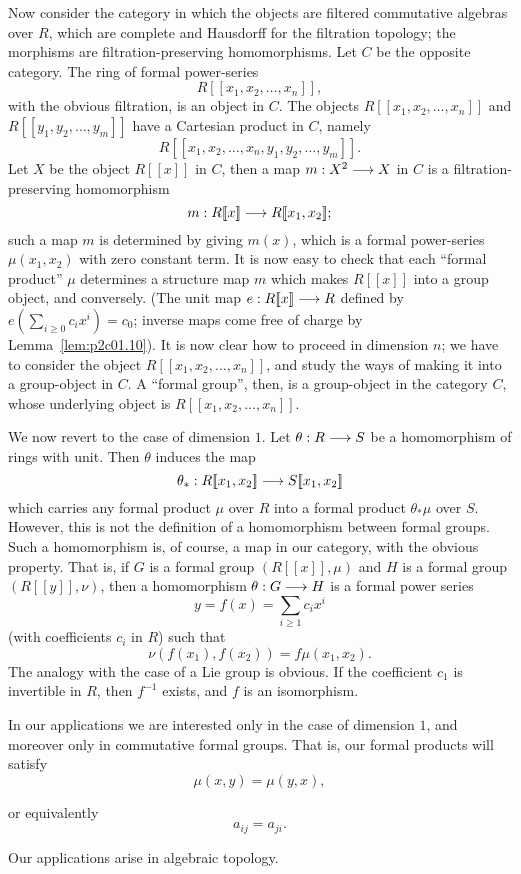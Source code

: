 \documentclass[../main]{subfiles}
\begin{document}
Now consider the category in which the objects are filtered commutative algebras over $R$, which are complete and Hausdorff for the filtration topology; the morphisms are filtration-preserving homomorphisms. Let $C$ be the opposite category. The ring of formal power-series $$R[\![x_1, x_2, \ldots, x_n]\!],$$ with the obvious filtration, is an object in $C$. The objects $R[\![x_1, x_2, \ldots, x_n]\!]$ and $R[\![y_1, y_2, \ldots, y_m]\!]$ have a Cartesian product in $C$, namely $$R[\![x_1, x_2, \ldots, x_n, y_1, y_2, \ldots, y_m]\!].$$ Let $X$ be the object $R[\![x]\!]$ in $C$, then a map $m : X^2 \overset{}{\longrightarrow} X$ in $C$ is a filtration-preserving homomorphism $$m : R[\![x]\!] \overset{}{\longrightarrow} R[\![x_1, x_2]\!];$$ such a map $m$ is determined by giving $m(x)$, which is a formal power-series $\mu(x_1, x_2)$ with zero constant term. It is now easy to check that each ``formal product'' $\mu$ determines a structure map $m$ which makes $R[\![x]\!]$ into a group object, and conversely. (The unit map $e : R[\![x]\!] \overset{}{\longrightarrow} R$ defined by $\displaystyle e \left(\sum_{i \ge 0} c_i x^i\right) = c_0$; inverse  maps come free of charge by Lemma~\ref{lem:p2c01.10}). It is now clear how to proceed in dimension $n$; we have to consider the object $R[\![x_1, x_2, \ldots, x_n]\!]$, and study the ways of making it into a group-object in $C$. A ``formal group'', then, is a group-object in the category $C$, whose underlying object is $R[\![x_1, x_2, \ldots, x_n]\!]$.

We now revert to the case of dimension $1$. Let $\theta : R \overset{}{\longrightarrow} S$ be a homomorphism of rings with unit. Then $\theta$ induces the map $$\theta_\ast : R[\![x_1, x_2]\!] \overset{}{\longrightarrow} S[\![x_1, x_2]\!]$$ which carries any formal product $\mu$ over $R$ into a formal product $\theta_\ast \mu$ over $S$. However, this is not the definition of a homomorphism between formal groups. Such a homomorphism is, of course, a map in our category, with the obvious property. That is, if $G$ is a formal group $(R[\![x]\!], \mu)$ and $H$ is a formal group $(R[\![y]\!], \nu)$, then a homomorphism $\theta : G \overset{}{\longrightarrow} H$ is a formal power series $$y = f(x) = \sum_{i \ge 1} c_i x^i$$ (with coefficients $c_i$ in $R$) such that $$\nu(f(x_1), f(x_2)) = f\mu(x_1, x_2).$$ The analogy with the case of a Lie group is obvious. If the coefficient $c_1$ is invertible in $R$, then $f^{-1}$ exists, and $f$ is an isomorphism.

In our applications we are interested only in the case of dimension $1$, and moreover only in commutative formal groups. That is, our formal products will satisfy 
\begin{equation}
\tag{1.11}
\label{eqn:p2c01.11}
\mu(x, y) = \mu(y, x),
\end{equation}

or equivalently
\begin{equation}
\tag{1.12}
\label{eqn:p2c01.12}
a_{ij} = a_{ji}.
\end{equation}

Our applications arise in algebraic topology.
\end{document}
